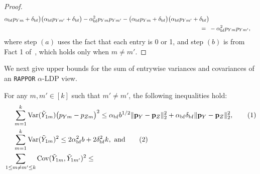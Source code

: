 \documentclass[twoside,11pt]{article}
\newcommand\numberthis{\addtocounter{equation}{1}\tag{\theequation}}
\newcommand{\rvTwo}{Y}
\newcommand{\rvThree}{Z}
\newcommand{\private}[1]{\tilde{#1}}
\newcommand{\normSqMultinomMax}{b}
\newcommand{\alphabetSize}{k} %
\newcommand{\vectorIndex}{m}
\newcommand{\probVecElement}[2]{p_{{#1}{#2}}}
\newcommand{\probVec}{\mathbf{p}} %
\newcommand{\privacyParameter}{\alpha} %
\newcommand{\privacyParameterrappor}{\privacyParameter_{\mathrm{bf}}}
\newcommand{\smallNumber}{\delta}
\newcommand{\smallNumberrappor}{\smallNumber_{\mathrm{bf}}}
\begin{document}
\begin{appendix}
\begin{proof}
\begin{align*}
			\privacyParameterrappor 
			\probVecElement{\rvTwo}{\vectorIndex}
			+ \smallNumberrappor
			\bigr) \bigl(
			\privacyParameterrappor 
			\probVecElement{\rvTwo}{\vectorIndex'}
			+ \smallNumberrappor	
			\bigr)
			-
			\privacyParameterrappor^2 \probVecElement{\rvTwo}{\vectorIndex} \probVecElement{\rvTwo}{\vectorIndex'}
			-
			\bigl(
			\privacyParameterrappor 
			\probVecElement{\rvTwo}{\vectorIndex}
			+ \smallNumberrappor
			\bigr) \bigl(
			\privacyParameterrappor 
			\probVecElement{\rvTwo}{\vectorIndex'}
			+ \smallNumberrappor	
			\bigr)
			\\ = \hskip 1.96mm &%
			-
			\privacyParameterrappor^2
			\probVecElement{\rvTwo}{\vectorIndex}
			\probVecElement{\rvTwo}{\vectorIndex'},
		\end{align*}
		where step $(a)$ uses the fact that each entry is 0 or 1, and step $(b)$ is from Fact 1 of~\citet{acharya_test_2019}, which holds only when $m \neq m'.$
	\end{proof}
	We next give upper bounds for the sum of  entrywise variances and covariances of an \texttt{RAPPOR} $\privacyParameter$-LDP view.
	\begin{lemma}\label{rappor:inequalities}
		For any $\vectorIndex, \vectorIndex' \in [\alphabetSize]$ such that $\vectorIndex' \neq \vectorIndex'$, the following inequalities hold:
		\begin{align*}
			& \quad \ \sum_{\vectorIndex=1}^\alphabetSize
			\mathrm{Var}
			( %
			\private{\rvTwo}_{1 \vectorIndex}
			) %
			\bigl( %
			\probVecElement{\rvTwo}{\vectorIndex}
			- %
			\probVecElement{\rvThree}{\vectorIndex}
			\bigr)^2
			\leq
			\privacyParameterrappor
			\normSqMultinomMax^{1/2}
			\|\probVec_{\rvTwo} - \probVec_{\rvThree}\|_2^2
			+
			\privacyParameterrappor
			\smallNumberrappor
			\|\probVec_{\rvTwo} - \probVec_{\rvThree}\|_2^2,
			\numberthis
			\label{inequality:var_diff_squared}
			\\& \quad \ 
			\sum_{\vectorIndex = 1}^\alphabetSize
			\mathrm{Var}(\private{Y}_{1 \vectorIndex})^2
			\leq
			2
			\privacyParameterrappor^2
			\normSqMultinomMax
			+
			2
			\smallNumberrappor^2
			\alphabetSize,~\text{and}
			\numberthis \label{inequality:var_squared}
			\\&
			\sum_{1 \leq \vectorIndex \neq \vectorIndex' \leq \alphabetSize}
			\mathrm{Cov}(\private{Y}_{1 \vectorIndex}, \private{Y}_{1 \vectorIndex'})^2
			\leq

\end{align*}
\end{lemma}
\end{appendix}
\end{document}

